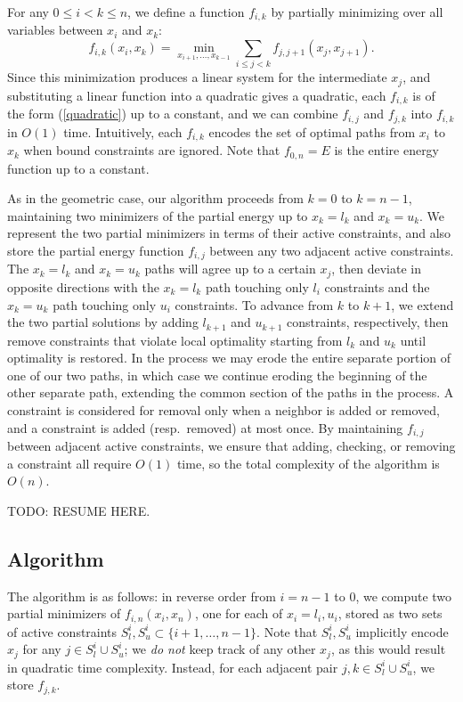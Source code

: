 \documentclass[11pt]{article}
\newcommand{\TODO}{{\color{red} TODO}}
\begin{document}
For any $0 \le i < k \le n$, we define a function $f_{i,k}$ by partially minimizing over all variables between $x_i$ and $x_k$:
$$f_{i,k}(x_i,x_k) = \min_{x_{i+1}, \ldots, x_{k-1}} \sum_{i \le j < k} f_{j,j+1}(x_j,x_{j+1}).$$
Since this minimization produces a linear system for the intermediate $x_j$, and substituting a linear function into a quadratic gives a quadratic, each $f_{i,k}$ is of the form (\ref{quadratic}) up to a constant,
and we can combine $f_{i,j}$ and $f_{j,k}$ into $f_{i,k}$ in $O(1)$ time.  Intuitively, each $f_{i,k}$ encodes the set of optimal paths from $x_i$ to $x_k$ when bound constraints are ignored.  Note that $f_{0,n} = E$
is the entire energy function up to a constant.

As in the geometric case, our algorithm proceeds from $k = 0$ to $k = n-1$, maintaining two minimizers of the partial energy up to $x_k = l_k$ and $x_k = u_k$.  We represent the two partial minimizers in terms of
their active constraints, and also store the partial energy function $f_{i,j}$ between any two adjacent active constraints.  The $x_k = l_k$ and $x_k = u_k$ paths will agree up to a certain $x_j$, then deviate
in opposite directions with the $x_k = l_k$ path touching only $l_i$ constraints and the $x_k = u_k$ path touching only $u_i$ constraints.  To advance from $k$ to $k+1$, we extend the two partial solutions by adding
$l_{k+1}$ and $u_{k+1}$ constraints, respectively, then remove constraints that violate local optimality starting from $l_k$ and $u_k$ until optimality is restored.  In the process we may erode the entire separate
portion of one of our two paths, in which case we continue eroding the beginning of the other separate path, extending the common section of the paths in the process.  A constraint is considered for removal only
when a neighbor is added or removed, and a constraint is added (resp.\ removed) at most once.  By maintaining $f_{i,j}$ between adjacent active constraints, we ensure that adding, checking, or removing a constraint all
require $O(1)$ time, so the total complexity of the algorithm is $O(n)$.

\TODO: RESUME HERE.

\subsection{Algorithm}

The algorithm is as follows: in reverse order from $i = n-1$ to $0$, we compute two partial minimizers of $f_{i,n}(x_i,x_n)$, one for each of $x_i = l_i, u_i$, stored as two sets of active constraints
$S_l^i, S_u^i \subset \{i+1, \ldots, n-1\}$.
Note that $S_l^i, S_u^i$ implicitly encode $x_j$ for any $j \in S_l^i \cup S_u^i$; we \emph{do not} keep track of any other $x_j$, as this would result in quadratic time complexity.  Instead, for each adjacent pair
$j,k \in S_l^i \cup S_u^i$, we store $f_{j,k}$.
\end{document}
